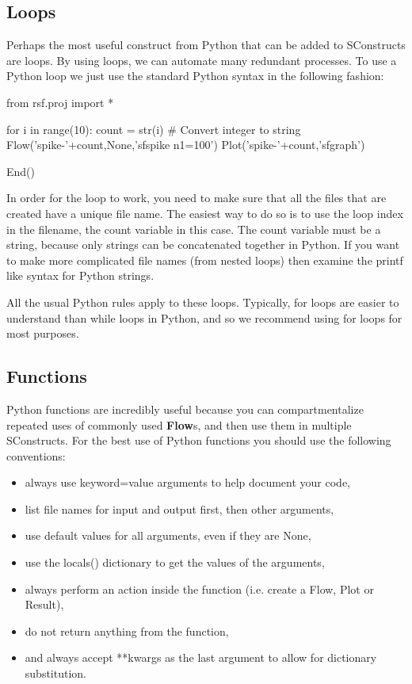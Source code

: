 \subsection{Loops}

Perhaps the most useful construct from Python that can be added to SConstructs are loops.  By using loops, we can automate many redundant processes.  To use a Python loop we just use the standard Python syntax in the following fashion:
\begin{verbatimtab}[4]
from rsf.proj import *

for i in range(10):
	count = str(i) # Convert integer to string
	Flow('spike-'+count,None,'sfspike n1=100')
	Plot('spike-'+count,'sfgraph')
	
End()
\end{verbatimtab}
In order for the loop to work, you need to make sure that all the files that are created have a unique file name.  The easiest way to do so is to use the loop index in the filename, the count variable in this case.  The count variable must be a string, because only strings can be concatenated together in Python.   If you want to make more complicated file names (from nested loops) then examine the printf like syntax for Python strings. 

All the usual Python rules apply to these loops.  Typically, for loops are easier to understand than while loops in Python, and so we recommend using for loops for most purposes.

\subsection{Functions}

Python functions are incredibly useful because you can compartmentalize repeated uses of commonly used \textbf{Flow}s, and then use them in multiple SConstructs.  For the best use of Python functions you should use the following conventions:

\begin{itemize}
\item always use keyword=value arguments to help document your code,
\item list file names for input and output first, then other arguments,
\item use default values for all arguments, even if they are None,
\item use the locals() dictionary to get the values of the arguments,
\item always perform an action inside the function (i.e. create a Flow, Plot or Result),
\item do not return anything from the function,
\item and always accept **kwargs as the last argument to allow for dictionary substitution.
\end{itemize}

